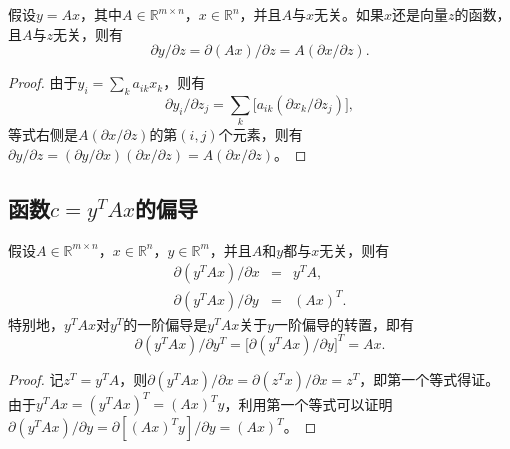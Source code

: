 \begin{proposition}
假设$y=Ax$，其中$A\in \mathbb R^{m\times n}$，$x\in \mathbb R^n$，并且$A$与$x$无关。如果$x$还是向量$z$的函数，且$A$与$z$无关，则有
\begin{equation}
    \partial y/\partial z = \partial (Ax)/\partial z = A (\partial x/\partial z).
\end{equation}
\end{proposition}
\begin{proof}
由于$y_i=\sum\limits_k a_{ik} x_k$，则有
\[
    \partial y_i/\partial z_j = \sum\limits_k \big[a_{ik} (\partial x_k/\partial z_j)\big],
\]
等式右侧是$A (\partial x/\partial z)$的第$(i,j)$个元素，则有$\partial y/\partial z = (\partial y/\partial x)(\partial x/\partial z) = A (\partial x/\partial z)$。
\end{proof}

\subsection{函数$c = y^T A x$的偏导}
\begin{proposition}
假设$A\in \mathbb R^{m\times n}$，$x\in \mathbb R^n$，$y\in \mathbb R^m$，并且$A$和$y$都与$x$无关，则有
\begin{eqnarray}
  \partial (y^T Ax)/\partial x &=& y^T A, \\
  \partial (y^T Ax)/\partial y &=& (Ax)^T.
\end{eqnarray}
特别地，$y^T Ax$对$y^T$的一阶偏导是$y^T Ax$关于$y$一阶偏导的转置，即有
\begin{equation}
    \partial (y^T Ax)/\partial y^T = \big[\partial (y^T Ax)/\partial y\big]^T = Ax.
\end{equation}
\end{proposition}
\begin{proof}
记$z^T=y^T A$，则$\partial (y^T Ax)/\partial x = \partial (z^T x)/\partial x = z^T$，即第一个等式得证。由于$y^T Ax = (y^T Ax)^T = (Ax)^T y$，利用第一个等式可以证明$\partial (y^T Ax)/\partial y = \partial [(Ax)^T y]/\partial y = (Ax)^T$。
\end{proof}

